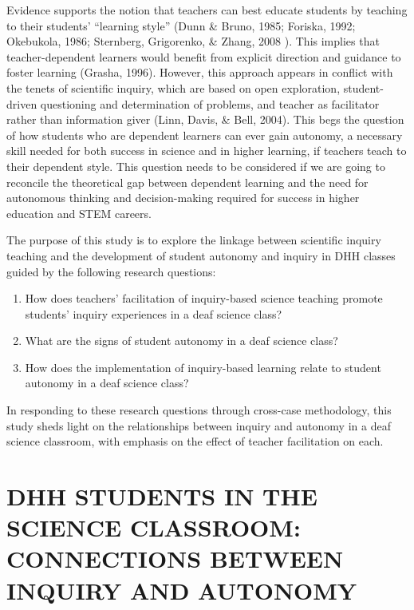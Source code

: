 \documentclass[11.5pt]{sig-alternate} %
\begin{document}
\begin{large}
Evidence supports the notion that teachers can best educate students by teaching to their students’ “learning style” (Dunn \& Bruno, 1985; Foriska, 1992; Okebukola, 1986; Sternberg, Grigorenko, \& Zhang, 2008 ).  This implies that teacher-dependent learners would benefit from explicit direction and guidance to foster learning (Grasha, 1996).  However, this approach appears in conflict with the tenets of scientific inquiry, which are based on open exploration, student-driven questioning and determination of problems, and teacher as facilitator rather than information giver (Linn, Davis, \& Bell, 2004). This begs the question of how students who are dependent learners can ever gain autonomy, a necessary skill needed for both success in science and in higher learning, if teachers teach to their dependent style. This question needs to be considered if we are going to reconcile the theoretical gap between dependent learning and the need for autonomous thinking and decision-making required for success in higher education and STEM careers.

The purpose of this study is to explore the linkage between scientific inquiry teaching and the development of student autonomy and inquiry in DHH classes guided by the following research questions: 
\begin{enumerate}
    \item How does teachers’ facilitation of inquiry-based science teaching promote students’ inquiry experiences in a deaf science class?
    \item What are the signs of student autonomy in a deaf science class?
    \item How does the implementation of inquiry-based learning relate to student autonomy in a deaf science class?
\end{enumerate}
In responding to these research questions through cross-case methodology, this study sheds light on the relationships between inquiry and autonomy in a deaf science classroom, with emphasis on the effect of teacher facilitation on each.  

\section*{DHH STUDENTS IN THE SCIENCE CLASSROOM: CONNECTIONS BETWEEN INQUIRY AND AUTONOMY}


\end{large}
\end{document}
